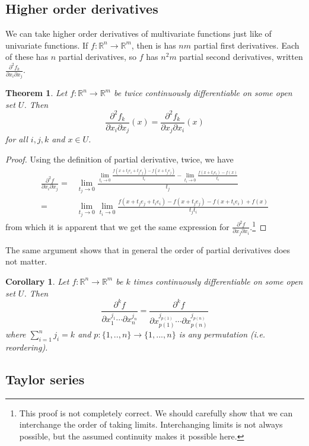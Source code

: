 \documentclass[12pt,reqno]{amsart}
\newtheorem{theorem}{Theorem}[section]
\newtheorem{corollary}{Corollary}[section]
\theoremstyle{definition}
\def\R{\mathbb{R}}
\renewcommand{\to}{{\rightarrow}}
\begin{document}
\subsection{Higher order derivatives}
We can take higher order derivatives of multivariate functions just
like of univariate functions. If $f: \R^n \to \R^m$, then is has $nm$
partial first derivatives. Each of these has $n$ partial derivatives,
so $f$ has $n^2m$ partial second derivatives, written
$\frac{\partial^2 f_k}{\partial x_i \partial x_j}$. 
\begin{theorem}
  Let $f: \R^n \to \R^m$ be twice continuously differentiable on some
  open set $U$. Then
  \[ \frac{\partial^2 f_k}{\partial x_i \partial
    x_j}(x) =  \frac{\partial^2 f_k}{\partial x_j \partial
    x_i} (x) \]
  for all $i,j,k$ and $ x \in U$.
\end{theorem}
\begin{proof}
  Using the definition of partial derivative, twice, we have
  \begin{align*}
    \frac{\partial^2 f}{\partial x_i \partial x_j} = & \lim_{t_j \to 0}
    \frac{ \lim_{t_i \to 0} \frac{ f(x + t_i e_i + t_j e_j) - f(x +
        t_j e_j)}{t_i} - \lim_{t_i \to 0} \frac{ f(x + t_i e_i) -
        f(x)}{t_i} }{t_j} \\
    = & \lim_{t_j \to 0} \lim_{t_i \to 0} \frac{f(x+t_je_j + t_i e_i)
      - f(x + t_j e_j) - f(x + t_i e_i) + f(x)} {t_j t_i}
  \end{align*}
  from which it is apparent that we get the same expression for $
  \frac{\partial^2 f}{\partial x_j \partial x_i} $.\footnote{This
    proof is not completely correct. We should carefully show that we
    can interchange the order of taking limits. Interchanging limits
    is not always possible, but the assumed continuity makes it
    possible here.}
\end{proof}
The same argument shows that in general the order of partial
derivatives does not matter.
\begin{corollary}
  Let $f: \R^n \to \R^m$ be $k$ times continuously differentiable on
  some open set $U$. Then 
  \[ \frac{\partial^k f}{\partial x_1^{j_1} \cdots
     \partial x_n^{j_n}} = 
  \frac{\partial^k f}{\partial x_{p(1)}^{j_{p(1)}}  \cdots \partial
    x_{p(n)}^{j_{p(n)}}} \]
  where $\sum_{i=1}^n j_i = k$ and $p:\{1,..,n\} \to \{1,...,n\}$ is
  any permutation (i.e. reordering).
\end{corollary}

\subsection{Taylor series}
\end{document}
